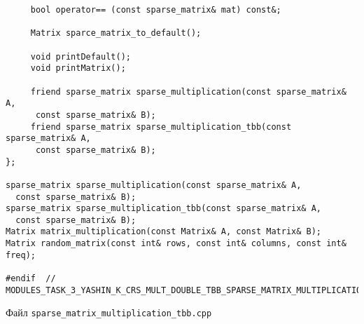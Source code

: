 \documentclass{report}
\begin{document}
\begin{lstlisting}
     bool operator== (const sparse_matrix& mat) const&;

     Matrix sparce_matrix_to_default();

     void printDefault();
     void printMatrix();

     friend sparse_matrix sparse_multiplication(const sparse_matrix& A,
      const sparse_matrix& B);
     friend sparse_matrix sparse_multiplication_tbb(const sparse_matrix& A,
      const sparse_matrix& B);
};

sparse_matrix sparse_multiplication(const sparse_matrix& A,
  const sparse_matrix& B);
sparse_matrix sparse_multiplication_tbb(const sparse_matrix& A,
  const sparse_matrix& B);
Matrix matrix_multiplication(const Matrix& A, const Matrix& B);
Matrix random_matrix(const int& rows, const int& columns, const int& freq);

#endif  // MODULES_TASK_3_YASHIN_K_CRS_MULT_DOUBLE_TBB_SPARSE_MATRIX_MULTIPLICATION_TBB_H_

\end{lstlisting}
Файл \verb|sparse_matrix_multiplication_tbb.cpp|
\end{document}
